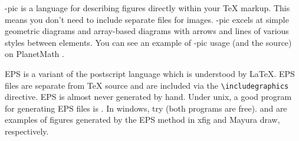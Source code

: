 \Xy-pic is a language for describing figures directly within your TeX markup. This means you don't need to include separate files for images. \Xy-pic excels at simple geometric diagrams and array-based diagrams with arrows and lines of various styles between elements. You can see an example of \Xy-pic usage (and the source) on PlanetMath .

EPS is a variant of the postscript language which is understood by \LaTeX. EPS files are separate from \TeX{} source and are included via the \texttt{\textbackslash{}includegraphics} directive. EPS is almost never generated by hand. Under unix, a good program for generating EPS files is . In windows, try  (both programs are free).  and  are examples of figures generated by the EPS method in xfig and Mayura draw, respectively.

